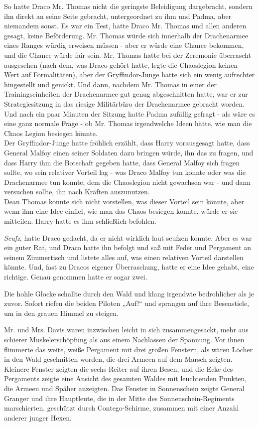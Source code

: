 {So hatte Draco Mr. Thomas nicht die geringste Beleidigung dargebracht, sondern ihn direkt an seine Seite gebracht, untergeordnet zu ihm und Padma, aber niemandem sonst. Es war ein Test, hatte Draco Mr. Thomas und allen anderen gesagt, keine Beförderung. Mr. Thomas würde sich innerhalb der Drachenarmee eines Ranges würdig erweisen müssen - aber er würde eine Chance bekommen, und die Chance würde fair sein. Mr. Thomas hatte bei der Zeremonie überrascht ausgesehen (nach dem, was Draco gehört hatte, legte die Chaoslegion keinen Wert auf Formalitäten), aber der Gryffindor-Junge hatte sich ein wenig aufrechter hingestellt und genickt. Und dann, nachdem Mr. Thomas in einer der Trainingseinheiten der Drachenarmee gut genug abgeschnitten hatte, war er zur Strategiesitzung in das riesige Militärbüro der Drachenarmee gebracht worden. Und nach ein paar Minuten der Sitzung hatte Padma zufällig gefragt - als wäre es eine ganz normale Frage - ob Mr. Thomas irgendwelche Ideen hätte, wie man die Chaos Legion besiegen könnte.\\ Der Gryffindor-Junge hatte fröhlich erzählt, dass Harry vorausgesagt hatte, dass General Malfoy einen seiner Soldaten dazu bringen würde, ihn das zu fragen, und dass Harry ihm die Botschaft gegeben hatte, dass General Malfoy sich fragen sollte, wo sein relativer Vorteil lag - was Draco Malfoy tun konnte oder was die Drachenarmee tun konnte, dem die Chaoslegion nicht gewachsen war - und dann versuchen sollte, ihn nach Kräften auszunutzen.\\ Dean Thomas konnte sich nicht vorstellen, was dieser Vorteil sein könnte, aber wenn ihm eine Idee einfiel, wie man das Chaos besiegen konnte, würde er sie mitteilen. Harry hatte es ihm schließlich befohlen.

\emph{Seufz}, hatte Draco gedacht, da er nicht wirklich laut seufzen konnte. Aber es war ein guter Rat, und Draco hatte ihn befolgt und saß mit Feder und Pergament an seinem Zimmertisch und listete alles auf, was einen relativen Vorteil darstellen könnte. Und, fast zu Dracos eigener Überraschung, hatte er eine Idee gehabt, eine richtige. Genau genommen hatte er sogar zwei.

Die hohle Glocke schallte durch den Wald und klang irgendwie bedrohlicher als je zuvor. Sofort riefen die beiden Piloten „Auf!“ und sprangen auf ihre Besenstiele, um in den grauen Himmel zu steigen.

Mr. und Mrs. Davis waren inzwischen leicht in sich zusammengesackt, mehr aus schierer Muskelerschöpfung als aus einem Nachlassen der Spannung. Vor ihnen flimmerte das weite, weiße Pergament mit drei großen Fenstern, als wären Löcher in den Wald geschnitten worden, die drei Armeen auf dem Marsch zeigten. Kleinere Fenster zeigten die sechs Reiter auf ihren Besen, und die Ecke des Pergaments zeigte eine Ansicht des gesamten Waldes mit leuchtenden Punkten, die Armeen und Späher anzeigten. Das Fenster in Sonnenschein zeigte General Granger und ihre Hauptleute, die in der Mitte des Sonnenschein-Regiments marschierten, geschützt durch Contego-Schirme, zusammen mit einer Anzahl anderer junger Hexen.

}
